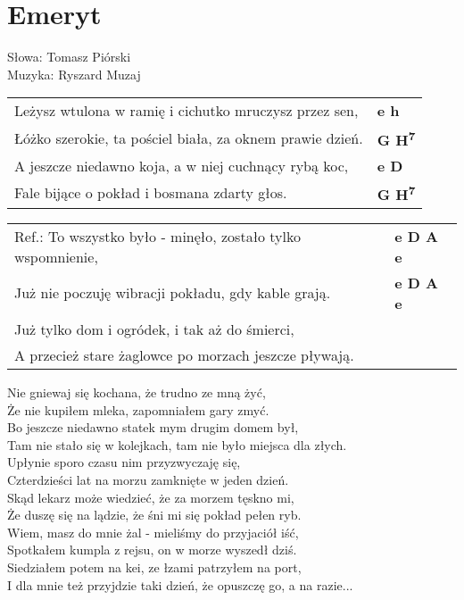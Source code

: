 \section{Emeryt}

Słowa: Tomasz Piórski\\
Muzyka: Ryszard Muzaj

\vspace{2em}
\begin{tabular}{@{}p{10cm}@{}l@{}}
Leżysz wtulona w ramię i cichutko mruczysz przez sen, & \bfseries  e h \\
Łóżko szerokie, ta pościel biała, za oknem prawie dzień. & \bfseries  G H\textsuperscript{7} \\
A jeszcze niedawno koja, a w niej cuchnący rybą koc, & \bfseries  e D \\
Fale bijące o pokład i bosmana zdarty głos. & \bfseries  G H\textsuperscript{7} \\
\end{tabular}

\vspace{1em}
\begin{tabular}{@{}p{10cm}@{}l@{}}
Ref.: To wszystko było - minęło, zostało tylko wspomnienie, & \bfseries  e D A e \\
Już nie poczuję wibracji pokładu, gdy kable grają. & \bfseries e D A e \\
Już tylko dom i ogródek, i tak aż do śmierci, \\
A przecież stare żaglowce po morzach jeszcze pływają. \\
\end{tabular}

\vspace{1em}
Nie gniewaj się kochana, że trudno ze mną żyć, \\
Że nie kupiłem mleka, zapomniałem gary zmyć. \\
Bo jeszcze niedawno statek mym drugim domem był, \\
Tam nie stało się w kolejkach, tam nie było miejsca dla złych. \\

Upłynie sporo czasu nim przyzwyczaję się, \\
Czterdzieści lat na morzu zamknięte w jeden dzień. \\
Skąd lekarz może wiedzieć, że za morzem tęskno mi, \\
Że duszę się na lądzie, że śni mi się pokład pełen ryb. \\

Wiem, masz do mnie żal - mieliśmy do przyjaciół iść, \\
Spotkałem kumpla z rejsu, on w morze wyszedł dziś. \\
Siedziałem potem na kei, ze łzami patrzyłem na port, \\
I dla mnie też przyjdzie taki dzień, że opuszczę go, a na razie... \\